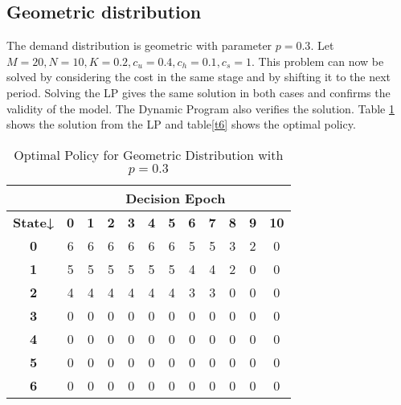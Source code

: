 \documentclass[11pt,a4paper,oneside]{report}
\begin{document}
\subsection{Geometric distribution}
The demand distribution is geometric with parameter $p=0.3$. Let $M = 20, N = 10, K=0.2, c_u=0.4, c_h=0.1, c_s=1$. This problem can now be solved by considering the cost in the same stage and by shifting it to the next period. Solving the LP gives the same solution in both cases and confirms the validity of the model. The Dynamic Program also verifies the solution. Table \ref{t2} shows the solution from the LP and table\ref{t6} shows the optimal policy.
\begin{table}[H]
\centering
\caption{Optimal Policy for Geometric Distribution with $p = 0.3$}
\label{t2}
\begin{tabular}{|c|c|c|c|c|c|c|c|c|c|c|c|}
\hline
\textbf{}       & \multicolumn{11}{c|}{\textbf{Decision Epoch}}                                                                                                 \\ \hline
\textbf{State↓} & \textbf{0} & \textbf{1} & \textbf{2} & \textbf{3} & \textbf{4} & \textbf{5} & \textbf{6} & \textbf{7} & \textbf{8} & \textbf{9} & \textbf{10} \\ \hline
\textbf{0}      & 6          & 6          & 6          & 6          & 6          & 6          & 5          & 5          & 3          & 2          & 0           \\ \hline
\textbf{1}      & 5          & 5          & 5          & 5          & 5          & 5          & 4          & 4          & 2          & 0          & 0           \\ \hline
\textbf{2}      & 4          & 4          & 4          & 4          & 4          & 4          & 3          & 3          & 0          & 0          & 0           \\ \hline
\textbf{3}      & 0          & 0          & 0          & 0          & 0          & 0          & 0          & 0          & 0          & 0          & 0           \\ \hline
\textbf{4}      & 0          & 0          & 0          & 0          & 0          & 0          & 0          & 0          & 0          & 0          & 0           \\ \hline
\textbf{5}      & 0          & 0          & 0          & 0          & 0          & 0          & 0          & 0          & 0          & 0          & 0           \\ \hline
\textbf{6}      & 0          & 0          & 0          & 0          & 0          & 0          & 0          & 0          & 0          & 0          & 0           \\ \hline

\end{tabular}
\end{table}
\end{document}
